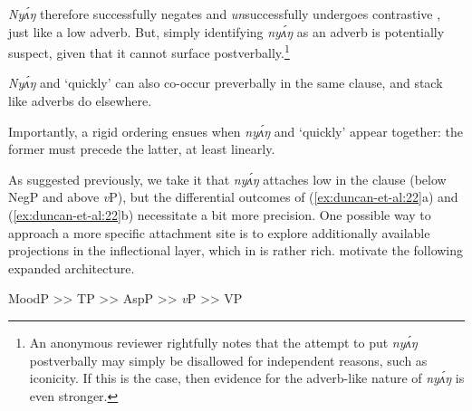 \documentclass[output=paper,modfonts,nonflat,
hidelinks
]{langsci/langscibook}
\begin{document}
\label{ex:duncan-et-al:21}
\z

\noindent \textit{Ny\'{ʌ}ŋ} therefore successfully negates and \textit{un}successfully undergoes contrastive , just like a low adverb. But, simply identifying \textit{ny\'{ʌ}ŋ} as an adverb is potentially suspect, given that it cannot surface postverbally.\footnote{An anonymous reviewer rightfully notes that the attempt to put \textit{ny\'{ʌ}ŋ} postverbally may simply be disallowed for independent reasons, such as iconicity. If this is the case, then evidence for the adverb-like nature of \textit{ny\'{ʌ}ŋ} is even stronger.}

\textit{Ny\'{ʌ}ŋ} and `quickly' can also co-occur preverbally in the same clause, and stack like adverbs do elsewhere.

\ea\label{ex:duncan-et-al:22}
\z
\z

\noindent Importantly, a rigid ordering ensues when \textit{ny\'{ʌ}ŋ} and `quickly' appear together: the former must precede the latter, at least linearly.

As suggested previously, we take it that \textit{ny\'{ʌ}ŋ} attaches low in the clause (below NegP and above \textit{v}P), but the differential outcomes of (\ref{ex:duncan-et-al:22}a) and (\ref{ex:duncan-et-al:22}b) necessitate a bit more precision. One possible way to approach a more specific attachment site is to explore additionally available projections in the inflectional layer, which in  is rather rich. \citet{baker2010agreement} motivate the following expanded architecture.

\ea\label{ex:duncan-et-al:23}
MoodP >> TP >> AspP >> \textit{v}P >> VP
\z
\end{document}
